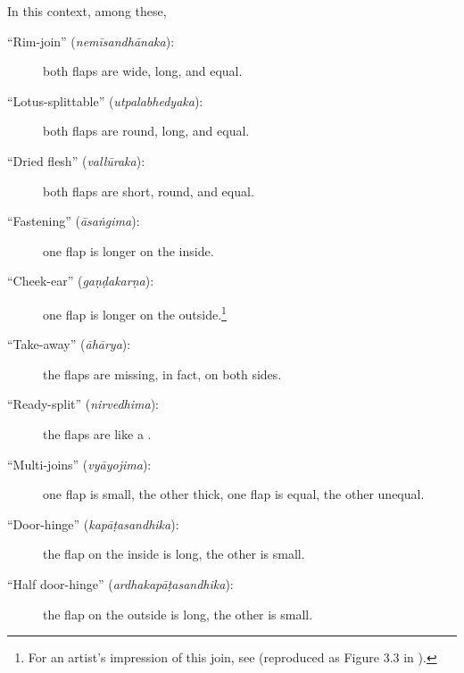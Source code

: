 \begin{translation}
    In this context, among these, 

    \begin{description}
        
\item[\mdseries``Rim-join'' (\emph{nemīsandhānaka}):]
        both flaps are wide, long, and equal.
        
\item[\mdseries``Lotus-splittable'' (\emph{utpalabhedyaka}):]
        both flaps are round, long, and equal.
        
\item[\mdseries``Dried flesh'' (\emph{vallūraka}):]
        both flaps are short, round, and equal.
        
\item[\mdseries``Fastening'' (\emph{āsaṅgima}):]
        one flap is longer on the inside.
        
\item[\mdseries``Cheek-ear'' (\emph{gaṇḍakarṇa}):]
        one flap is longer on the outside.\footnote{For an artist's impression of this join, see \cite[291]{majn-1975} (reproduced as Figure 3.3 in \cites[155]{wuja-2003}).}
        
\item[\mdseries``Take-away'' (\emph{āhārya}):]
        the flaps are missing, in fact, on both sides.
        
\item[\mdseries``Ready-split'' (\emph{nirvedhima}):]
        the flaps are like a .
        
\item[\mdseries``Multi-joins'' (\emph{vyāyojima}):]
        one flap is small, the other thick, one flap is equal, the other unequal.
        
\item[\mdseries``Door-hinge'' (\emph{kapāṭasandhika}):]
        the flap on the inside is long, the other is small.
        
\item[\mdseries``Half door-hinge'' (\emph{ardhakapāṭasandhika}):]
        the flap on the outside is long, the other is small.
    \end{description}


\end{translation}
